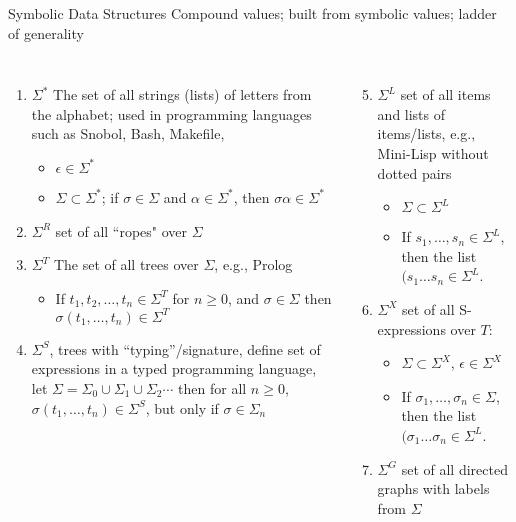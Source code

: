 \documentclass[aspectratio=169]{beamer}
\begin{document}
\begin{frame}{Symbolic Data Structures}
Compound values; built from symbolic values; ladder of generality
\scriptsize
\begin{columns}
    \begin{enumerate}
        \item $\Sigma^*$ The set of all strings (lists) of letters from the alphabet; used
        in programming languages such as Snobol, Bash, Makefile, 
        \begin{itemize}
            \item $\epsilon \in \Sigma^*$
            \item $\Sigma \subset \Sigma^*$; if $\sigma\in\Sigma$ and $\alpha\in \Sigma^*$, then $\sigma\alpha\in\Sigma^*$ 
        \end{itemize}
    \item $\Sigma^R$ set of all ``ropes" over $\Sigma$
        \item $\Sigma^T$ The set of all trees over $\Sigma$, e.g., Prolog
        \begin{itemize}
        \item If $t_1, t_2, \ldots,t_n \in \Sigma^T$ for  $n\ge0$, 
            and $\sigma \in \Sigma$ 
            then $\sigma(t_1,\ldots,t_n) \in \Sigma^T$  
        \end{itemize}
        \item  $\Sigma^S$, trees with ``typing''/signature, define set of expressions in a typed programming language, let $ \Sigma = \Sigma_0 \cup \Sigma_1\cup\Sigma_2\cdots$ 
         then for all $n\ge0$, $\sigma(t_1,\ldots,t_n) \in \Sigma^S$, 
            but  only if $\sigma\in\Sigma_n$ 
        \end{enumerate}
        \begin{enumerate}\setcounter{enumi}{4}
        
        \item $\Sigma^L$ set of all items and lists of items/lists, e.g., Mini-Lisp without 
        dotted pairs
        \begin{itemize}
        \item $\Sigma\subset\Sigma^L$
        \item If $s_1,\ldots,s_n \in\Sigma^L$, then the list
            $(s_1 \ldots s_n \in \Sigma^L$.
        \end{itemize}
    \item $\Sigma^X$ set of all S-expressions over $T$: 
        \begin{itemize}
        \item $\Sigma\subset\Sigma^X$, $\epsilon\in \Sigma^X$
        \item If $\sigma_1,\ldots,\sigma_n \in\Sigma$, then the list
            $(\sigma_1 \ldots \sigma_n \in \Sigma^L$.
        \end{itemize}
    \item $\Sigma^G$ set of all directed graphs with labels from $\Sigma$ 
        \end{enumerate}
    \end{columns}
\end{frame}
\end{document}
